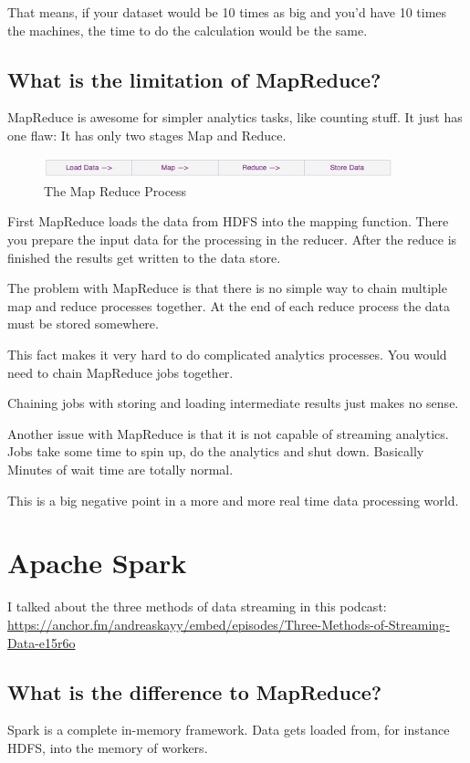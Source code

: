 \documentclass[12pt, numbers=noenddot]{scrreprt} %
\begin{document}
That means, if your dataset would be 10 times as big and you’d have 10 times the machines, the time to do the calculation would be the same.

\subsection{What is the limitation of MapReduce?}
MapReduce is awesome for simpler analytics tasks, like counting stuff. It just has one flaw: It has only two stages Map and Reduce.

\begin{figure}[htbp]
  \centering
     \includegraphics[width=0.9\textwidth]{images/MapReduce-Process.png}
  \caption{The Map Reduce Process}
  \label{fig:Bild1}
\end{figure}

First MapReduce loads the data from HDFS into the mapping function. There you prepare the input data for the processing in the reducer. After the reduce is finished the results get written to the data store.

The problem with MapReduce is that there is no simple way to chain multiple map and reduce processes together. At the end of each reduce process the data must be stored somewhere.

This fact makes it very hard to do complicated analytics processes. You would need to chain MapReduce jobs together.

Chaining jobs with storing and loading intermediate results just makes no sense.

Another issue with MapReduce is that it is not capable of streaming analytics. Jobs take some time to spin up, do the analytics and shut down. Basically Minutes of wait time are totally normal.

This is a big negative point in a more and more real time data processing world.


\section{Apache Spark}
I talked about the three methods of data streaming in this podcast: \url{https://anchor.fm/andreaskayy/embed/episodes/Three-Methods-of-Streaming-Data-e15r6o}


\subsection{What is the difference to MapReduce?}
Spark is a complete in-memory framework. Data gets loaded from, for instance HDFS, into the memory of workers.
\end{document}
